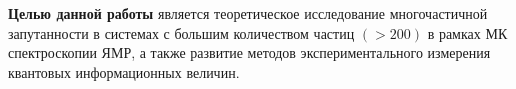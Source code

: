 \textbf{Целью данной работы} является теоретическое исследование многочастичной запутанности в системах с большим количеством частиц $(>200)$ в рамках МК спектроскопии ЯМР,
а также развитие методов экспериментального измерения квантовых информационных величин.